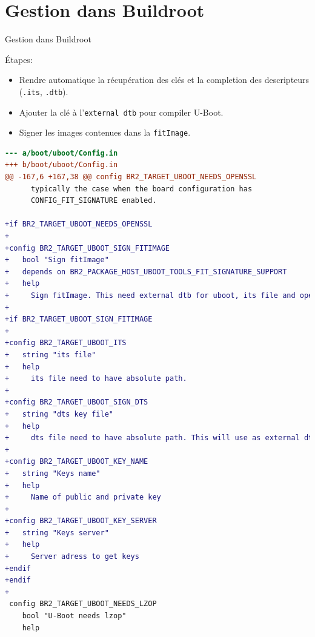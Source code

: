 \documentclass[aspectratio=169]{beamer}
\begin{document}
\section{Gestion dans Buildroot}

\begin{frame}
\begin{center}
\huge{Gestion dans Buildroot}
\end{center}
\end{frame}

\begin{frame}
Étapes:
\begin{itemize}
\item Rendre automatique la récupération des clés et la completion des descripteurs (\texttt{.its}, \texttt{.dtb}).
\item Ajouter la clé à l'\texttt{external dtb} pour compiler U-Boot.
\item Signer les images contenues dans la \texttt{fitImage}.
\end{itemize}
\end{frame}

\begin{frame}[fragile]
\begin{lstlisting}[language=diff,basicstyle=\fontsize{5}{5}\selectfont\ttfamily\color{white}]
--- a/boot/uboot/Config.in
+++ b/boot/uboot/Config.in
@@ -167,6 +167,38 @@ config BR2_TARGET_UBOOT_NEEDS_OPENSSL
 	  typically the case when the board configuration has
 	  CONFIG_FIT_SIGNATURE enabled.
 
+if BR2_TARGET_UBOOT_NEEDS_OPENSSL
+
+config BR2_TARGET_UBOOT_SIGN_FITIMAGE
+	bool "Sign fitImage"
+	depends on BR2_PACKAGE_HOST_UBOOT_TOOLS_FIT_SIGNATURE_SUPPORT
+	help
+	  Sign fitImage. This need external dtb for uboot, its file and openssl key.
+
+if BR2_TARGET_UBOOT_SIGN_FITIMAGE
+
+config BR2_TARGET_UBOOT_ITS
+	string "its file"
+	help
+	  its file need to have absolute path.
+
+config BR2_TARGET_UBOOT_SIGN_DTS
+	string "dts key file"
+	help
+	  dts file need to have absolute path. This will use as external dtb.
+
+config BR2_TARGET_UBOOT_KEY_NAME
+	string "Keys name"
+	help
+	  Name of public and private key
+
+config BR2_TARGET_UBOOT_KEY_SERVER
+	string "Keys server"
+	help
+	  Server adress to get keys
+endif
+endif
+
 config BR2_TARGET_UBOOT_NEEDS_LZOP
 	bool "U-Boot needs lzop"
 	help
\end{lstlisting}
\end{frame}
\end{document}
